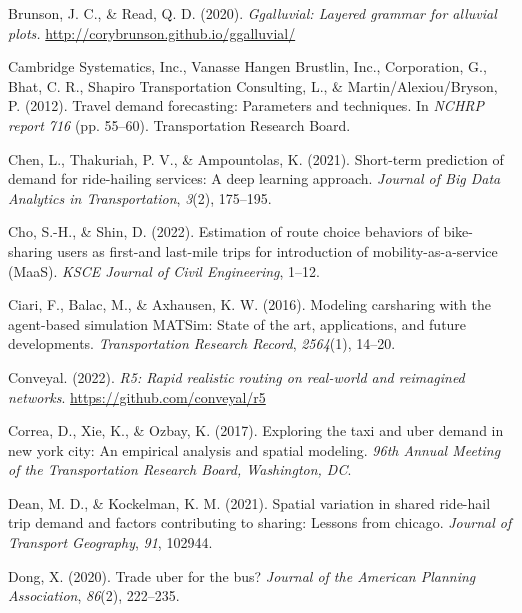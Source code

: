 \documentclass[simple, masters, twoside]{byuthesis}
\newlength{\cslhangindent}
\newlength{\cslentryspacingunit} %
\newenvironment{CSLReferences}[2] %
 {%
  \setlength{\parindent}{0pt}
  \ifodd #1
  \let\oldpar\par
  \def\par{\hangindent=\cslhangindent\oldpar}
  \fi
  \setlength{\parskip}{#2\cslentryspacingunit}
 }%
 {}
\begin{document}
\begin{CSLReferences}{1}{0}
\leavevmode{}%
Brunson, J. C., \& Read, Q. D. (2020). \emph{Ggalluvial: Layered grammar for alluvial plots.} \url{http://corybrunson.github.io/ggalluvial/}

\leavevmode{}%
Cambridge Systematics, Inc., Vanasse Hangen Brustlin, Inc., Corporation, G., Bhat, C. R., Shapiro Transportation Consulting, L., \& Martin/Alexiou/Bryson, P. (2012). Travel demand forecasting: Parameters and techniques. In \emph{NCHRP report 716} (pp. 55--60). Transportation Research Board.

\leavevmode{}%
Chen, L., Thakuriah, P. V., \& Ampountolas, K. (2021). Short-term prediction of demand for ride-hailing services: A deep learning approach. \emph{Journal of Big Data Analytics in Transportation}, \emph{3}(2), 175--195.

\leavevmode{}%
Cho, S.-H., \& Shin, D. (2022). Estimation of route choice behaviors of bike-sharing users as first-and last-mile trips for introduction of mobility-as-a-service (MaaS). \emph{KSCE Journal of Civil Engineering}, 1--12.

\leavevmode{}%
Ciari, F., Balac, M., \& Axhausen, K. W. (2016). Modeling carsharing with the agent-based simulation MATSim: State of the art, applications, and future developments. \emph{Transportation Research Record}, \emph{2564}(1), 14--20.

\leavevmode{}%
Conveyal. (2022). \emph{R5: Rapid realistic routing on real-world and reimagined networks}. \url{https://github.com/conveyal/r5}

\leavevmode{}%
Correa, D., Xie, K., \& Ozbay, K. (2017). Exploring the taxi and uber demand in new york city: An empirical analysis and spatial modeling. \emph{96th Annual Meeting of the Transportation Research Board, Washington, DC}.

\leavevmode{}%
Dean, M. D., \& Kockelman, K. M. (2021). Spatial variation in shared ride-hail trip demand and factors contributing to sharing: Lessons from chicago. \emph{Journal of Transport Geography}, \emph{91}, 102944.

\leavevmode{}%
Dong, X. (2020). Trade uber for the bus? \emph{Journal of the American Planning Association}, \emph{86}(2), 222--235.


\end{CSLReferences}
\end{document}
